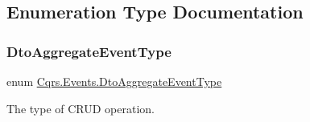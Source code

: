 \subsection{Enumeration Type Documentation}
\mbox{\label{namespaceCqrs_1_1Events_a2a32e13adeac92f5a93966cd8ee2d39a_a2a32e13adeac92f5a93966cd8ee2d39a}} 
\subsubsection{\texorpdfstring{Dto\+Aggregate\+Event\+Type}{DtoAggregateEventType}}
{\footnotesize\ttfamily enum \hyperlink{namespaceCqrs_1_1Events_a2a32e13adeac92f5a93966cd8ee2d39a_a2a32e13adeac92f5a93966cd8ee2d39a}{Cqrs.\+Events.\+Dto\+Aggregate\+Event\+Type}\hspace{0.3cm}{\ttfamily [strong]}}



The type of C\+R\+UD operation. 

